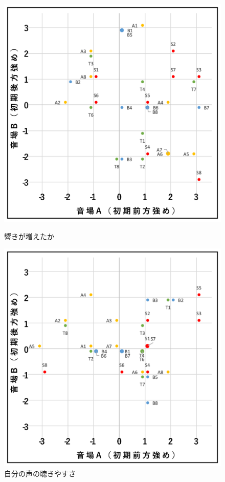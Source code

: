 \documentclass[11pt,a4j]{jreport}
\begin{document}
\begin{figure}[H]
  \begin{minipage}{0.5\linewidth}
    \centering
    \includegraphics[width=.9\linewidth]{images/subjectiveExp/scat_early_01reverb.png}
    \caption*{響きが増えたか}
  \end{minipage}%
  \begin{minipage}{0.5\linewidth}
    \centering
    \includegraphics[width=.9\linewidth]{images/subjectiveExp/scat_early_02selfVoice.png}
    \caption*{自分の声の聴きやすさ}
  \end{minipage}


\end{figure}
\end{document}
